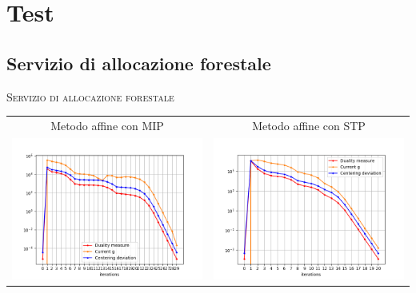 \section{Test}

\subsection{Servizio di allocazione forestale}

\begin{frame}{\textsc{\LARGE \textcolor{iris}{Servizio di allocazione forestale}}}
\centering
\begin{tabular}{c@{}c}
\small{Metodo affine con MIP} & \small{Metodo affine con STP} \\
	\includegraphics[scale = 0.33]{for_aff1}
	&\includegraphics[scale = 0.33]{for_aff3}\\ 
\end{tabular}
\end{frame}

